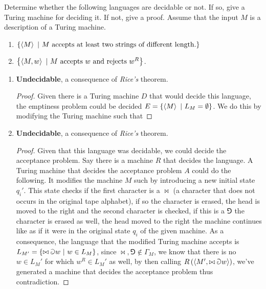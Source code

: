\documentclass{article}
\begin{document}
\begin{exercise}
Determine whether the following languages are decidable or not. If so, give a Turing machine for deciding it. If not, give a proof. Assume that the input $M$ is a description of a Turing machine.
\begin{enumerate}
 \item $\left\{ \left\langle M \right\rangle\ |\ \mbox{$M$ accepts at least two strings of different length.} \right\}$
 \item $\left\{ \left\langle M,w \right\rangle\ |\ \mbox{$M$ accepts $w$ and rejects $w^R$} \right\}$.
\end{enumerate}
\end{exercise}
\begin{answer}
\begin{enumerate}
 \item \textbf{Undecidable}, a consequence of \emph{Rice's} theorem.
 \begin{proof}
  Given there is a Turing machine $D$ that would decide this language, the emptiness problem could be decided $E=\left\{ \left\langle M \right\rangle\ |\ L_M=\emptyset \right\}$. We do this by modifying the Turing machine such that 
 \end{proof}
 \item \textbf{Undecidable}, a consequence of \emph{Rice's} theorem.
 \begin{proof}Given that this language was decidable, we could decide the acceptance problem. Say there is a machine $R$ that decides the language. A Turing machine that decides the acceptance problem $A$ could do the following. It modifies the machine $M$ such by introducing a new initial state $q_i'$. This state checks if the first character is a $\bowtie$ (a character that does not occurs in the original tape alphabet), if so the character is erased, the head is moved to the right and the second character is checked, if this is a $\Game$ the character is erased as well, the head moved to the right the machine continues like as if it were in the original state $q_i$ of the given machine. As a consequence, the language that the modified Turing machine accepts is $L_{M'}=\left\{ \bowtie\Game w\ |\ w\in L_M \right\}$, since $\bowtie,\Game\notin\Gamma_M$, we know that there is no $w\in L_M'$ for which $w^R\in L_M'$ as well, by then calling $R\left( \left\langle M',\bowtie\Game w \right\rangle \right)$, we've generated a machine that decides the acceptance problem thus contradiction.\end{proof}
\end{enumerate}
\end{answer}
\end{document}
